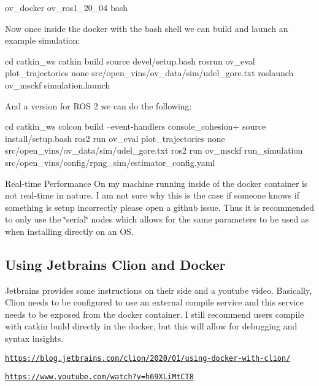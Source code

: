 \begin{DoxyCode}
ov\_docker ov\_ros1\_20\_04 bash
\end{DoxyCode}


Now once inside the docker with the bash shell we can build and launch an example simulation\+:


\begin{DoxyCode}
cd catkin\_ws
catkin build
source devel/setup.bash
rosrun ov\_eval plot\_trajectories none src/open\_vins/ov\_data/sim/udel\_gore.txt
roslaunch ov\_msckf simulation.launch
\end{DoxyCode}


And a version for R\+OS 2 we can do the following\+:


\begin{DoxyCode}
cd catkin\_ws
colcon build --event-handlers console\_cohesion+
source install/setup.bash
ros2 run ov\_eval plot\_trajectories none src/open\_vins/ov\_data/sim/udel\_gore.txt
ros2 run ov\_msckf run\_simulation src/open\_vins/config/rpng\_sim/estimator\_config.yaml
\end{DoxyCode}




\begin{DoxyParagraph}{Real-\/time Performance}
On my machine running inside of the docker container is not real-\/time in nature. I am not sure why this is the case if someone knows if something is setup incorrectly please open a github issue. Thus it is recommended to only use the \char`\"{}serial\char`\"{} nodes which allows for the same parameters to be used as when installing directly on an OS.
\end{DoxyParagraph}
\hypertarget{dev-docker_dev-docker-clion}{}\subsection{Using Jetbrains Clion and Docker}\label{dev-docker_dev-docker-clion}


Jetbrains provides some instructions on their side and a youtube video. Basically, Clion needs to be configured to use an external compile service and this service needs to be exposed from the docker container. I still recommend users compile with {\ttfamily catkin build} directly in the docker, but this will allow for debugging and syntax insights.


\begin{DoxyItemize}
\item \href{https://blog.jetbrains.com/clion/2020/01/using-docker-with-clion/}{\tt https\+://blog.\+jetbrains.\+com/clion/2020/01/using-\/docker-\/with-\/clion/}
\item \href{https://www.youtube.com/watch?v=h69XLiMtCT8}{\tt https\+://www.\+youtube.\+com/watch?v=h69\+X\+Li\+Mt\+C\+T8}
\end{DoxyItemize}

